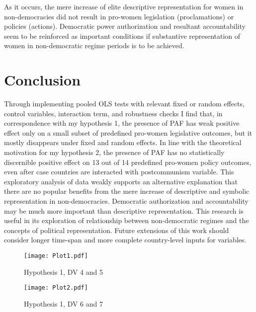 \documentclass[12pt]{article}
\begin{document}
As it occurs, the mere increase of elite descriptive representation for women in non-democracies did not result in pro-women legislation (proclamations) or policies (actions). Democratic power authorization and resultant accountability seem to be reinforced as important conditions if substantive representation of women in non-democratic regime periods is to be achieved. 

\section*{Conclusion}
Through implementing pooled OLS tests with relevant fixed or random effects, control variables, interaction term, and robustness checks I find that, in correspondence with my hypothesis 1, the presence of PAF has weak positive effect only on a small subset of predefined pro-women legislative outcomes, but it mostly disappears under fixed and random effects. In line with the theoretical motivation for my hypothesis 2, the presence of PAF has no statistically discernible positive effect on 13 out of 14 predefined pro-women policy outcomes, even after case countries are interacted with postcommunism variable. This exploratory analysis of data weakly supports an alternative explanation that there are no popular benefits from the mere increase of descriptive and symbolic representation in non-democracies. Democratic authorization and accountability may be much more important than descriptive representation. This research is useful in its exploration of relationship between non-democratic regimes and the concepts of political representation. Future extensions of this work should consider longer time-span and more complete country-level inputs for variables.

\begin{figure}[!htbp]
\centering
\texttt{[image: Plot1.pdf]}
\caption{Hypothesis 1, DV 4 and 5}
\label{fig:hypothesis 1 1-2}
\end{figure}


\begin{figure}[htp]
\centering
\texttt{[image: Plot2.pdf]}
\caption{Hypothesis 1, DV 6 and 7}
\label{fig:hypothesis 1 3-4}
\end{figure}
\end{document}
